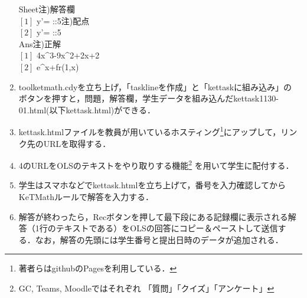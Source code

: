 \documentclass[a4j,12pt]{ujarticle}
\begin{document}
\begin{enumerate}
\begin{minipage}[t]{68mm}
\hspace*{2zw}Sheet\hfill{\small 注)解答欄}\\
\hspace*{2zw}$[1]$ y'=  ::5\hfill{\small 注)配点}\\
\hspace*{2zw}$[2]$ y'=  ::5\\
\hspace*{2zw}Ans\hfill{\small 注)正解}\\
\hspace*{2zw}$[1]$ 4x\^{}3-9x\^{}2+2x+2\\
\hspace*{2zw}$[2]$ e{}\^{}x+fr(1,x)\\
\end{minipage}\vspace{-1mm}

\item toolketmath.cdyを立ち上げ，「tasklineを作成」と「kettaskに組み込み」の
ボタンを押すと，問題，解答欄，学生データを組み込んだkettask1130-01.html(以下kettask.html)ができる．\vspace{-2mm}
\item kettask.htmlファイルを教員が用いているホスティング\footnote{著者らはgithubのPagesを利用している．}にアップして，リンク先のURLを取得する．\vspace{-2mm}
\item 4のURLをOLSのテキストをやり取りする機能\footnote{GC, Teams, Moodleではそれぞれ
「質問」「クイズ」「アンケート」} を用いて学生に配付する．\vspace{-2mm}
\item 学生はスマホなどでkettask.htmlを立ち上げて，番号を入力確認してからKeTMathルールで解答を入力する．\vspace{-2mm}
\item 解答が終わったら，Recボタンを押して最下段にある記録欄に表示される解答（1行のテキストである）をOLSの回答にコピー＆ペーストして送信する．なお，解答の先頭には学生番号と提出日時のデータが追加される．\vspace{-1mm}
\end{enumerate}
\end{document}
